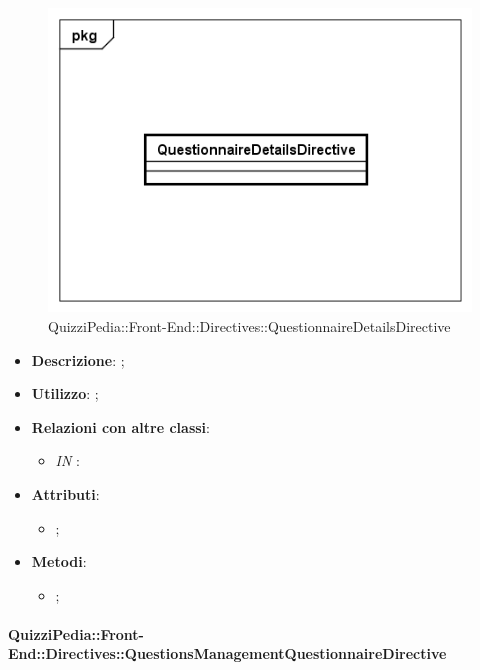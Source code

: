 \begin{figure}[h]
	\centering
	\includegraphics[scale=0.5,keepaspectratio]{UML/Classi/Front-End/QuizziPedia_Front-end_Directives_QuestionnaireDetailsDirective.png}
	\caption{QuizziPedia::Front-End::Directives::QuestionnaireDetailsDirective}
\end{figure}

\begin{itemize}
	\item \textbf{Descrizione}: ;
	\item \textbf{Utilizzo}: ;
	\item \textbf{Relazioni con altre classi}: 
	\begin{itemize}
		\item \textit{IN} \texttt{}: 
	\end{itemize}
	\item \textbf{Attributi}: 
	\begin{itemize}
		\item ;
	\end{itemize}
	\item \textbf{Metodi}: 
	\begin{itemize}
		\item ;
	\end{itemize}
\end{itemize}

\paragraph{QuizziPedia::Front-End::Directives::QuestionsManagementQuestionnaireDirective}

\label{QuizziPedia::Front-End::Directives::QuestionsManagementQuestionnaireDirective}

